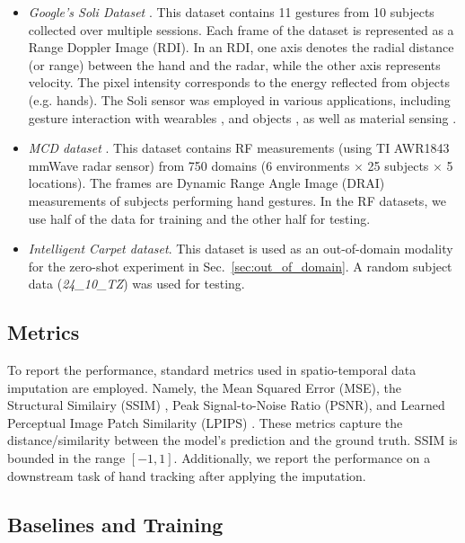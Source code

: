 \documentclass[10pt, conference, compsocconf]{IEEEtran}
\def\update#1{#1}
\begin{document}
\begin{itemize}
    \item \textit{Google's Soli Dataset} \cite{wang2016interacting}. This dataset contains 11 gestures from 10 subjects collected over multiple sessions. Each frame of the dataset is represented as a Range Doppler Image (RDI). In an RDI, one axis denotes the radial distance (or range) between the hand and the radar, while the other axis represents velocity. The pixel intensity corresponds to the energy reflected from objects (e.g. hands). The Soli sensor was employed in various applications, including gesture interaction with wearables \cite{wang2016interacting}, and objects \cite{vcopivc2019missing}, as well as material sensing \cite{vcopivc2022solids}. 
    
    \item \textit{MCD dataset} \cite{li2022towards}. This dataset contains RF measurements (using TI AWR1843 mmWave radar sensor) from 750 domains (6 environments $\times$ 25 subjects $\times$ 5 locations). The frames are Dynamic Range Angle Image (DRAI) measurements of subjects performing hand gestures.  In the RF datasets, we use half of the data for training and the other half for testing. 
    \item \textit{Intelligent Carpet dataset}\cite{luo2021intelligent}.  This dataset is used as an out-of-domain modality for the zero-shot experiment in Sec.~\ref{sec:out_of_domain}. A random subject data (\textit{24\_10\_TZ}) was used for testing.

\end{itemize}





\subsection{Metrics}

To report the performance, standard metrics used in spatio-temporal data imputation are employed. Namely, the Mean Squared Error (MSE), the Structural Similairy (SSIM) \cite{wang2004image}, Peak Signal-to-Noise Ratio (PSNR), and Learned Perceptual Image Patch Similarity (LPIPS) \cite{zhang2018unreasonable}.  These metrics capture \update{the} distance/similarity between the model's prediction and the ground truth. \update{SSIM is bounded in the range $[-1,1]$.} Additionally, we report the performance on a downstream task of hand tracking after applying the imputation.

\subsection{Baselines and Training}
\label{sec:eval_baseline_details}
\end{document}
